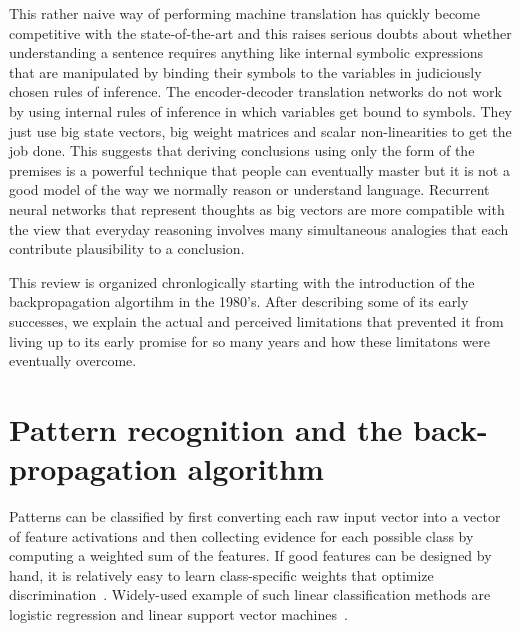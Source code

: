 \documentclass[]{article}
\begin{document}
This rather naive way of performing machine translation has quickly become
competitive with the state-of-the-art and this raises serious doubts about
whether understanding a sentence requires anything like internal symbolic
expressions that are manipulated by binding their symbols to the variables
in judiciously chosen rules of inference.  The encoder-decoder translation
networks do not work by using internal rules of inference in which
variables get bound to symbols. They just use big state vectors, big weight
matrices and scalar non-linearities to get the job done.  This suggests
that deriving conclusions using only the form of the premises is a powerful
technique that people can eventually master but it is not a good model of
the way we normally reason or understand language. Recurrent neural
networks that represent thoughts as big vectors are more compatible with
the view that everyday reasoning involves many simultaneous analogies that
each contribute plausibility to a conclusion\cite{metaphors}.

This review is organized chronlogically starting with the introduction of
the backpropagation algortihm in the 1980's. After describing some of its
early successes, we explain the actual and perceived limitations that
prevented it from living up to its early promise for so many years and how
these limitatons were eventually overcome.

\section{Pattern recognition and the back-propagation algorithm}

Patterns can be classified by first converting each raw input vector into a
vector of feature activations and then collecting evidence for each
possible class by computing a weighted sum of the features. If good
features can be designed by hand, it is relatively easy to learn
class-specific weights that optimize
discrimination~\cite{perceptrons}. Widely-used example of such linear
classification methods are logistic regression and linear support vector
machines~\cite{logisticregression,svm}.
\end{document}
